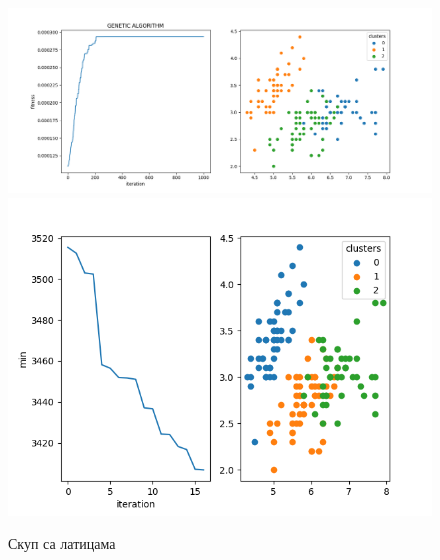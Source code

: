 \documentclass{article}
\begin{document}
\begin{figure}
    \includegraphics[width=\textwidth]{genetic_iris.png}\hfill
    \includegraphics[width=\textwidth]{greedy_iris.png}\hfill
    \caption{Скуп са латицама}\label{fig:foobar}
\end{figure}
\end{document}
